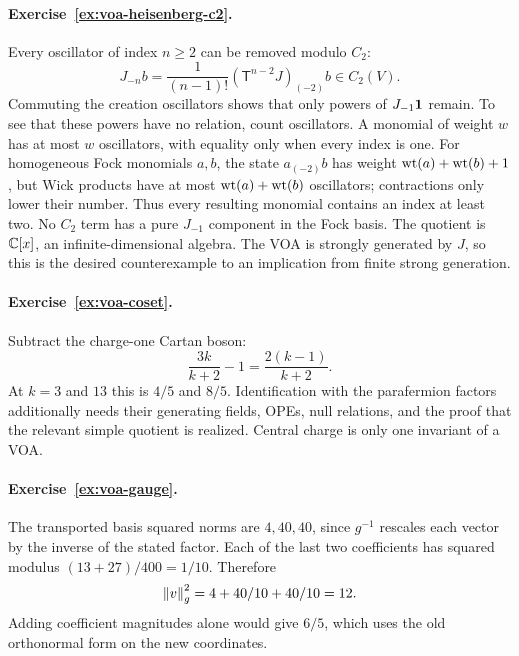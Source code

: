 \paragraph{Exercise~\ref{ex:voa-heisenberg-c2}.}
\label{sol:ex:voa-heisenberg-c2}
Every oscillator of index $n\ge2$ can be removed modulo $C_2$:
\[
 J_{-n}b=\frac1{(n-1)!}(\mathsf T^{n-2}J)_{(-2)}b
 \in C_2(V).
\]
Commuting the creation oscillators shows that only powers of
$J_{-1}\mathbf1$ remain. To see that these powers have no relation,
count oscillators. A monomial of weight $w$ has at most $w$
oscillators, with equality only when every index is one.
For homogeneous Fock monomials $a,b$, the state $a_{(-2)}b$
has weight $\operatorname{wt}(a)+\operatorname{wt}(b)+1$, but Wick products have at most
$\operatorname{wt}(a)+\operatorname{wt}(b)$ oscillators; contractions only lower their number.
Thus every resulting monomial contains an index at least two.
No $C_2$ term has a pure $J_{-1}$ component in the Fock basis.
The quotient is $\mathbb C[x]$, an infinite-dimensional algebra.
The VOA is strongly generated by $J$, so this is the desired
counterexample to an implication from finite strong generation.



\paragraph{Exercise~\ref{ex:voa-coset}.}
\label{sol:ex:voa-coset}
Subtract the charge-one Cartan boson:
\[
 \frac{3k}{k+2}-1=\frac{2(k-1)}{k+2}.
\]
At $k=3$ and $13$ this is $4/5$ and $8/5$.
Identification with the parafermion factors additionally needs
their generating fields, OPEs, null relations, and the proof
that the relevant simple quotient is realized. Central charge
is only one invariant of a VOA.



\paragraph{Exercise~\ref{ex:voa-gauge}.}
\label{sol:ex:voa-gauge}
The transported basis squared norms are $4,40,40$, since $g^{-1}$
rescales each vector by the inverse of the stated factor.
Each of the last two coefficients has squared modulus
$(13+27)/400=1/10$. Therefore
\[
 \left\lVert v\right\rVert_g^2=4+40/10+40/10=12.
\]
Adding coefficient magnitudes alone would give $6/5$,
which uses the old orthonormal form on the new coordinates.

